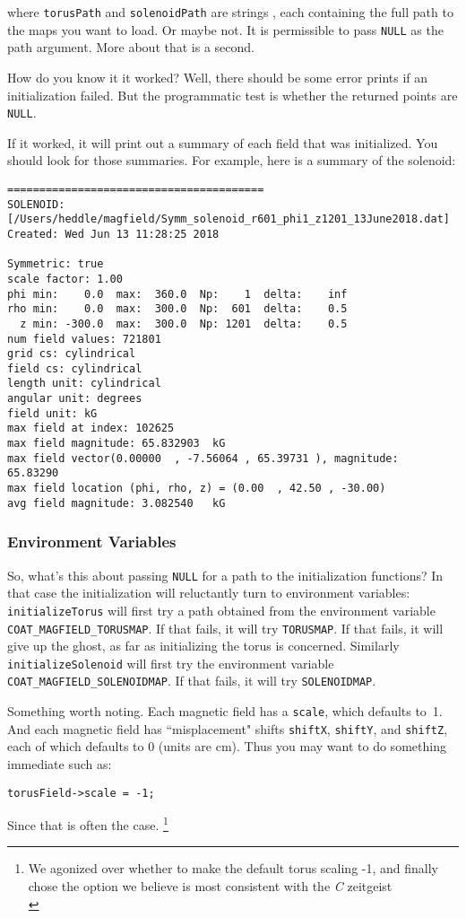 \documentclass{article}
\begin{document}
where \texttt{torusPath} and \texttt{solenoidPath} are strings , each containing the full path to the maps you want to load. Or maybe not. It is permissible to pass \texttt{NULL} as the path argument. More about that is a second. 

How do you know it it worked? Well, there  should be some error prints if an initialization failed. But the programmatic test is whether the returned points are \texttt{NULL}. 

If it worked, it will print out a summary of each field that was initialized. You should look for those summaries. For example, here is a summary of the solenoid:

\begin{verbatim} 
========================================
SOLENOID: [/Users/heddle/magfield/Symm_solenoid_r601_phi1_z1201_13June2018.dat]
Created: Wed Jun 13 11:28:25 2018

Symmetric: true
scale factor: 1.00  
phi min:    0.0  max:  360.0  Np:    1  delta:    inf
rho min:    0.0  max:  300.0  Np:  601  delta:    0.5
  z min: -300.0  max:  300.0  Np: 1201  delta:    0.5
num field values: 721801
grid cs: cylindrical
field cs: cylindrical
length unit: cylindrical
angular unit: degrees
field unit: kG
max field at index: 102625
max field magnitude: 65.832903  kG
max field vector(0.00000  , -7.56064 , 65.39731 ), magnitude:     65.83290
max field location (phi, rho, z) = (0.00  , 42.50 , -30.00)
avg field magnitude: 3.082540   kG
\end{verbatim}

\subsubsection{Environment Variables}
So, what's this about passing \texttt{NULL} for a path to the initialization functions? In that case the initialization will reluctantly turn to environment variables: \texttt{initializeTorus}  will first try a path obtained from the environment variable \texttt{COAT\_MAGFIELD\_TORUSMAP}. If that fails, it will try \texttt{TORUSMAP}. If that fails, it will give up the ghost, as far as initializing the torus is concerned. Similarly \texttt{initializeSolenoid} will first try the environment variable \texttt{COAT\_MAGFIELD\_SOLENOIDMAP}. If that fails, it will try \texttt{SOLENOIDMAP}. 

Something worth noting. Each magnetic field has a \texttt{scale}, which defaults to\ 1. And each magnetic field has ``misplacement" shifts \texttt{shiftX}, \texttt{shiftY}, and \texttt{shiftZ}, each of which defaults to 0 (units are cm). Thus you may want to do something immediate such as:
 \begin{verbatim} 
torusField->scale = -1;
\end{verbatim}
Since that is often the case. \footnote{We agonized over whether to make the default torus scaling -1, and finally chose the option we believe is most consistent with the \textit{C} zeitgeist\\}
\end{document}
